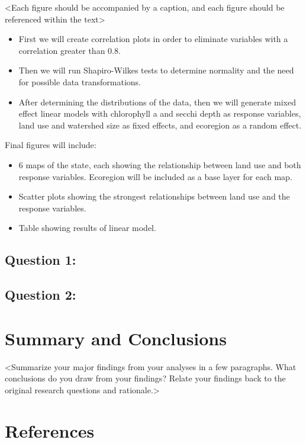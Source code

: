 \documentclass[12pt,]{article}
\providecommand{\tightlist}{%
  \setlength{\itemsep}{0pt}\setlength{\parskip}{0pt}}
\begin{document}
\textless Each figure should be accompanied by a caption, and each
figure should be referenced within the text\textgreater{}

\begin{itemize}
\tightlist
\item
  First we will create correlation plots in order to eliminate variables
  with a correlation greater than 0.8.
\item
  Then we will run Shapiro-Wilkes tests to determine normality and the
  need for possible data transformations.
\item
  After determining the distributions of the data, then we will generate
  mixed effect linear models with chlorophyll a and secchi depth as
  response variables, land use and watershed size as fixed effects, and
  ecoregion as a random effect.
\end{itemize}

Final figures will include:

\begin{itemize}
\tightlist
\item
  6 maps of the state, each showing the relationship between land use
  and both response variables. Ecoregion will be included as a base
  layer for each map.
\item
  Scatter plots showing the strongest relationships between land use and
  the response variables.
\item
  Table showing results of linear model.
\end{itemize}

\hypertarget{question-1}{%
\subsection{Question 1: }\label{question-1}}

\hypertarget{question-2}{%
\subsection{Question 2:}\label{question-2}}

\newpage

\hypertarget{summary-and-conclusions}{%
\section{Summary and Conclusions}\label{summary-and-conclusions}}

\textless Summarize your major findings from your analyses in a few
paragraphs. What conclusions do you draw from your findings? Relate your
findings back to the original research questions and
rationale.\textgreater{}

\newpage

\hypertarget{references}{%
\section{References}\label{references}}
\end{document}
